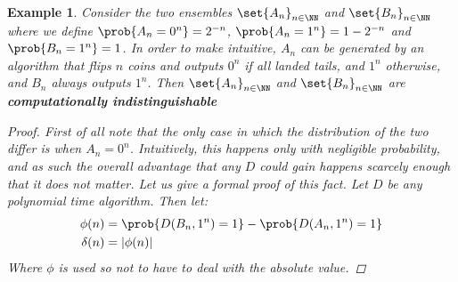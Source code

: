 \documentclass{article}
\newtheorem{example}{Example}
\begin{document}
\begin{example}
    Consider the two ensembles $\set{A_n}_{n \in \NN}$ and $\set{B_n}_{n \in \NN}$ where we define $\prob{A_n = 0^n} = 2^{-n}$, $\prob{A_n = 1^n} = 1 - 2^{-n}$ and $\prob{B_n = 1^n} = 1$. In order to make intuitive, $A_n$ can be generated by an algorithm that flips $n$ coins and outputs $0^n$ if all landed tails, and $1^n$ otherwise, and $B_n$ always outputs $1^n$. Then $\set{A_n}_{n \in \NN}$ and $\set{B_n}_{n \in \NN}$ are \textbf{computationally indistinguishable}
    \begin{proof}
        First of all note that the only case in which the distribution of the two differ is when $A_n = 0^n$. Intuitively, this happens only with negligible probability, and as such the overall advantage that any $D$ could gain happens scarcely enough that it does not matter. Let us give a formal proof of this fact. Let $D$ be any polynomial time algorithm. Then let:
        \begin{align*}
            \phi(n)   & =  \prob{D(B_n, 1^n) = 1} - \prob{D(A_n, 1^n) = 1} \\
            \delta(n) & = \left| \phi(n) \right|
        \end{align*}
        Where $\phi$ is used so not to have to deal with the absolute value.


\end{proof}
\end{example}
\end{document}
